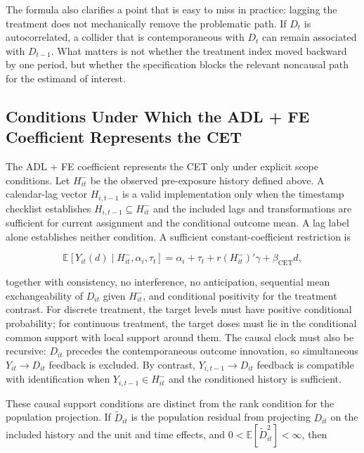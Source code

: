 \documentclass[
]{article}
\begin{document}
The formula also clarifies a point that is easy to miss in practice:
lagging the treatment does not mechanically remove the problematic path.
If \(D_t\) is autocorrelated, a collider that is contemporaneous with
\(D_t\) can remain associated with \(D_{t-1}\). What matters is not
whether the treatment index moved backward by one period, but whether
the specification blocks the relevant noncausal path for the estimand of
interest.

\subsection{Conditions Under Which the ADL + FE Coefficient Represents
the
CET}\label{conditions-under-which-the-adl-fe-coefficient-represents-the-cet}

The ADL + FE coefficient represents the CET only under explicit scope
conditions. Let \(H_{it}^{-}\) be the observed pre-exposure history
defined above. A calendar-lag vector \(H_{i,t-1}\) is a valid
implementation only when the timestamp checklist establishes
\(H_{i,t-1}\subseteq H_{it}^{-}\) and the included lags and
transformations are sufficient for current assignment and the
conditional outcome mean. A lag label alone establishes neither
condition. A sufficient constant-coefficient restriction is

\[
\mathbb{E}[Y_{it}(d)\mid H_{it}^{-},\alpha_i,\tau_t]
=
\alpha_i+\tau_t+r(H_{it}^{-})'\gamma+\beta_{\mathrm{CET}}d,
\]

together with consistency, no interference, no anticipation, sequential
mean exchangeability of \(D_{it}\) given \(H_{it}^{-}\), and conditional
positivity for the treatment contrast. For discrete treatment, the
target levels must have positive conditional probability; for continuous
treatment, the target doses must lie in the conditional common support
with local support around them. The causal clock must also be recursive:
\(D_{it}\) precedes the contemporaneous outcome innovation, so
simultaneous \(Y_{it}\rightarrow D_{it}\) feedback is excluded. By
contrast, \(Y_{i,t-1}\rightarrow D_{it}\) feedback is compatible with
identification when \(Y_{i,t-1}\in H_{it}^{-}\) and the conditioned
history is sufficient.

These causal support conditions are distinct from the rank condition for
the population projection. If \(\widetilde D_{it}\) is the population
residual from projecting \(D_{it}\) on the included history and the unit
and time effects, and \(0<\mathbb{E}[\widetilde D_{it}^{2}]<\infty\),
then
\end{document}
